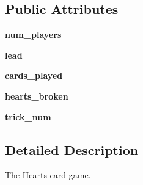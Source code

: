 \subsection*{Public Attributes}
\begin{DoxyCompactItemize}
\item 
\hypertarget{classcards-with-friends_1_1games_1_1hearts_1_1_hearts_a30da649bd6eafe45c045e30032922b01}{{\bfseries num\-\_\-players}}\label{classcards-with-friends_1_1games_1_1hearts_1_1_hearts_a30da649bd6eafe45c045e30032922b01}

\item 
\hypertarget{classcards-with-friends_1_1games_1_1hearts_1_1_hearts_ac0dc4138454e9f661e183bd1e816f8e7}{{\bfseries lead}}\label{classcards-with-friends_1_1games_1_1hearts_1_1_hearts_ac0dc4138454e9f661e183bd1e816f8e7}

\item 
\hypertarget{classcards-with-friends_1_1games_1_1hearts_1_1_hearts_a334b803060353eadafeccd821ef19d07}{{\bfseries cards\-\_\-played}}\label{classcards-with-friends_1_1games_1_1hearts_1_1_hearts_a334b803060353eadafeccd821ef19d07}

\item 
\hypertarget{classcards-with-friends_1_1games_1_1hearts_1_1_hearts_a857741e4ede3fc25c2d431b25f9e0a95}{{\bfseries hearts\-\_\-broken}}\label{classcards-with-friends_1_1games_1_1hearts_1_1_hearts_a857741e4ede3fc25c2d431b25f9e0a95}

\item 
\hypertarget{classcards-with-friends_1_1games_1_1hearts_1_1_hearts_a05e0e2f500277376a9bce951c6afffbb}{{\bfseries trick\-\_\-num}}\label{classcards-with-friends_1_1games_1_1hearts_1_1_hearts_a05e0e2f500277376a9bce951c6afffbb}

\end{DoxyCompactItemize}


\subsection{Detailed Description}
\begin{DoxyVerb}The Hearts card game.\end{DoxyVerb}
 

